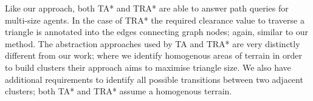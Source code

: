 \documentclass[letterpaper]{article}
\begin{document}
Like our approach, both TA* and TRA* are able to answer path queries for multi-size agents. In the case of TRA* the required clearance value to traverse a triangle is annotated into the edges connecting graph nodes; again, similar to our method. The abstraction approaches used by TA and TRA* are very distinctly different from our work; where we identify homogenous areas of terrain in order to build clusters their approach aims to maximise triangle size. We also have additional requirements to identify all possible transitions between two adjacent clusters; both TA* and TRA* assume a homogenous terrain.



\end{document}
